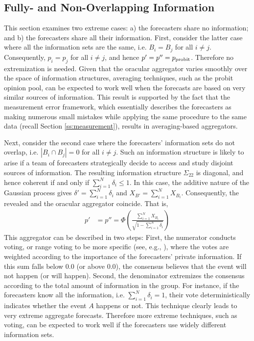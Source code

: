 \documentclass[11pt]{article}
\theoremstyle{definition}
\theoremstyle{definition}
\def\probit{p_{\rm probit}}
\begin{document}
\subsection{Fully- and Non-Overlapping Information}
\label{disjoint}
This section examines two extreme cases: a) the forecasters share
no information; and b) the forecasters share all their
information. First, consider the latter case where all the information
sets are the same, i.e. $B_{i} = B_j$ for all $i \neq j$. Consequently, $p_i = p_j$ for all $i \neq j$, and hence $p' = p'' = \probit$.
Therefore no
extremization is needed. Given that the oracular aggregator varies
smoothly over the space of information structures, averaging
techniques, such as the probit opinion pool, can be expected to work
well when the forecasts are based on very similar sources of
information. This result is supported by the fact that the
measurement error framework, which essentially describes the
forecasters as making numerous small mistakes while applying the same
procedure to the same data (recall Section \ref{ss:measurement}),
results in averaging-based aggregators.





Next, consider the second case where the forecasters' information
sets do not overlap, i.e. $|B_{i} \cap B_{j}| = 0$ for all $i \neq j$. Such
an information structure is likely to arise if a team of forecasters
strategically decide to access and study disjoint sources of
information. The resulting information structure $\Sigma_{22}$ is
diagonal, and hence coherent if and only if $\sum_{i=1}^N \delta_i
\leq 1$. In this case, the additive nature of the Gaussian process gives $\delta' = \sum_{i=1}^N \delta_i$ and $X_{B'} = \sum_{i=1}^N X_{B_i}$. Consequently, the revealed and  the oracular aggregator coincide. That is,
 \begin{align*}
p' &= p'' =  \Phi\left( \frac{\sum_{i=1}^N X_{B_i}}
  {\sqrt{1- \sum_{i=1}^N \delta_i}} \right) 
\end{align*}
This aggregator can be described in two steps: First, the numerator conducts voting, or range voting to be more specific (see, e.g.,
\citealt{fishkin1997voice}), where the votes are weighted according to
the importance of the forecasters' private information.  If this sum falls below
$0.0$ (or above $0.0$), the consensus believes that the event will not
happen (or will happen). Second, the
denominator extremizes the consensus according to the total
amount of information in the group. For instance, if the forecasters
know all the information, i.e. $\sum_{i=1}^N \delta_i = 1$, their vote
deterministically indicates whether the event $A$ happens or not. This
technique clearly leads to very extreme aggregate forecasts. Therefore
more extreme techniques, such as voting, can be expected to work well
if the forecasters use widely different information sets.
\end{document}
